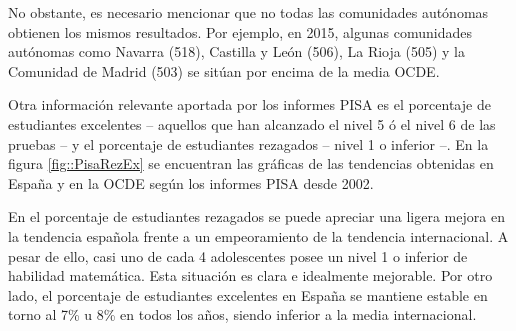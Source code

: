 No obstante, es necesario mencionar que no todas las comunidades autónomas obtienen los mismos resultados. 
%
Por ejemplo, en 2015, algunas comunidades autónomas como Navarra (518), Castilla y León (506), La Rioja (505) y la Comunidad de Madrid (503) se sitúan por encima de la media OCDE.


Otra información relevante aportada por los informes PISA es el porcentaje de estudiantes excelentes -- aquellos que han alcanzado el nivel 5 ó el nivel 6 de las pruebas -- y el porcentaje de estudiantes rezagados -- nivel 1 o inferior --.
%
En la figura \ref{fig::PisaRezEx} se encuentran las gráficas de las tendencias obtenidas en España y en la OCDE según los informes PISA desde 2002.



En el porcentaje de estudiantes rezagados se puede apreciar una ligera mejora en la tendencia española frente a un empeoramiento de la tendencia internacional.
%
A pesar de ello, casi uno de cada 4 adolescentes posee un nivel 1 o inferior de habilidad matemática. 
%
Esta situación es clara e idealmente mejorable.
%
Por otro lado, el porcentaje de estudiantes excelentes en España se mantiene estable en torno al 7\% u 8\% en todos los años, siendo inferior a la media internacional.

